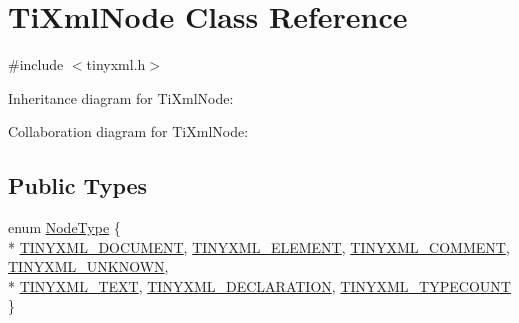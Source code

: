 \hypertarget{class_ti_xml_node}{\section{Ti\+Xml\+Node Class Reference}
\label{class_ti_xml_node}
}


{\ttfamily \#include $<$tinyxml.\+h$>$}



Inheritance diagram for Ti\+Xml\+Node\+:


Collaboration diagram for Ti\+Xml\+Node\+:
\subsection*{Public Types}
\begin{DoxyCompactItemize}
\item 
enum \hyperlink{class_ti_xml_node_a836eded4920ab9e9ef28496f48cd95a2}{Node\+Type} \{ \\*
\hyperlink{class_ti_xml_node_a836eded4920ab9e9ef28496f48cd95a2a76c4c520453398cd033e8b97ec9a0b04}{T\+I\+N\+Y\+X\+M\+L\+\_\+\+D\+O\+C\+U\+M\+E\+N\+T}, 
\hyperlink{class_ti_xml_node_a836eded4920ab9e9ef28496f48cd95a2a9ad167b17c3148d7a018fde9a41ce976}{T\+I\+N\+Y\+X\+M\+L\+\_\+\+E\+L\+E\+M\+E\+N\+T}, 
\hyperlink{class_ti_xml_node_a836eded4920ab9e9ef28496f48cd95a2a742eb78855db1e81614848072de03721}{T\+I\+N\+Y\+X\+M\+L\+\_\+\+C\+O\+M\+M\+E\+N\+T}, 
\hyperlink{class_ti_xml_node_a836eded4920ab9e9ef28496f48cd95a2a7376f9420c8ab507842c8a0813bb077e}{T\+I\+N\+Y\+X\+M\+L\+\_\+\+U\+N\+K\+N\+O\+W\+N}, 
\\*
\hyperlink{class_ti_xml_node_a836eded4920ab9e9ef28496f48cd95a2aa6177e9506461cdca7062559387a2714}{T\+I\+N\+Y\+X\+M\+L\+\_\+\+T\+E\+X\+T}, 
\hyperlink{class_ti_xml_node_a836eded4920ab9e9ef28496f48cd95a2a1e2351ad8cd0c805538d94222f3d8cd0}{T\+I\+N\+Y\+X\+M\+L\+\_\+\+D\+E\+C\+L\+A\+R\+A\+T\+I\+O\+N}, 
\hyperlink{class_ti_xml_node_a836eded4920ab9e9ef28496f48cd95a2a878567737ed539bd3de6a941027e9309}{T\+I\+N\+Y\+X\+M\+L\+\_\+\+T\+Y\+P\+E\+C\+O\+U\+N\+T}
 \}
\end{DoxyCompactItemize}
